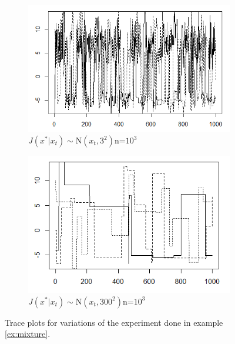 \documentclass[11pt]{amsart}
\theoremstyle{theorem} %
\theoremstyle{definition}                  %
\theoremstyle{example}                       %
\theoremstyle{remark}                       %
\numberwithin{equation}{section}
\begin{document}
\begin{figure}
\begin{subfigure}[b]{0.475\textwidth}
            \includegraphics[width=\textwidth]{bettermixing.png}
            \caption{$J(x^*|x_t)\sim \text{N}(x_t, 3^2)$\newline n=$10^3$}    
            \label{fig:mixbetter}
        \end{subfigure}
        \quad
        \begin{subfigure}[b]{0.475\textwidth}   
            \centering 
            \includegraphics[width=\textwidth]{mixbad.png}
            \caption{$J(x^*|x_t)\sim \text{N}(x_t, 300^2)$\newline n=$10^3$}    
            \label{fig:mixbad}
        \end{subfigure}
        \caption{Trace plots for variations of the experiment done in example \ref{ex:mixture}.} 
        \label{fig:traceplots}
    \end{figure}
\end{document}

